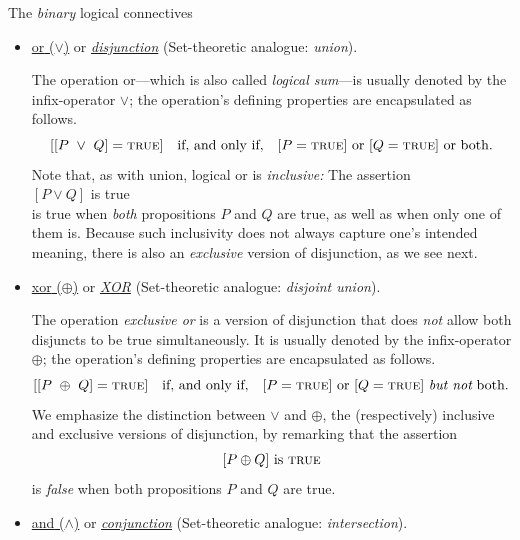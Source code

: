  {\small\sf The {\em binary} logical connectives}
\begin{itemize}
\item
\underline{{\sc or} ($\vee$)} or \underline{\it disjunction}
\hspace*{.1in}
{\small\sf (Set-theoretic analogue: {\em union})}.

\smallskip

The operation {\sc or}---which is also called {\em logical sum}---is usually denoted by the infix-operator $\vee$; the operation's defining properties are encapsulated as follows.
\[
[[P \ \vee \ Q] =  \mbox{\sc true}] \ \ \mbox{ if, and only if, } \ \ 
[P = \mbox{\sc true}] \mbox{ or }
[Q = \mbox{\sc true}] \mbox{ or both}.
\]
Note that, as with union, logical {\sc or} is {\em inclusive:}  The assertion \\
\hspace*{.35in}$[P \vee Q]$ is \mbox{\sc true} \\
%
is true when {\em both} propositions $P$ and $Q$ are true, as well as when only one of them is.  Because such inclusivity does not always capture one's intended meaning, there is also an {\em exclusive} version of disjunction, as we see next.

\item 
\underline{{\sc xor} ($\oplus$)} or \underline{\it XOR}
\hspace*{.1in}
{\small\sf (Set-theoretic analogue: {\em disjoint union})}.

\smallskip

The operation {\em exclusive or} is a version of disjunction that does {\em not} allow both disjuncts to be true simultaneously.  It is usually denoted by the infix-operator $\oplus$; the operation's defining properties are encapsulated as follows.
\[
[[P \ \oplus \ Q] =  \mbox{\sc true}] \ \ \mbox{ if, and only if, } \ \ 
[P = \mbox{\sc true}] \mbox{ or }
[Q = \mbox{\sc true}] \mbox{ {\em but not} both}.
\]
We emphasize the distinction between $\vee$ and $\oplus$, the (respectively) inclusive and exclusive versions of disjunction, by remarking that the assertion
\[
[P \oplus Q]  \mbox{ is } \mbox{\sc true}
\]
is {\em false} when both propositions $P$ and $Q$ are true.

\item
\underline{{\sc and} ($\wedge$)} or \underline{\it conjunction}
\hspace*{.1in}
{\small\sf (Set-theoretic analogue: {\em intersection})}.
\index{logical operation!conjunction ($\wedge$)}


\end{itemize}
